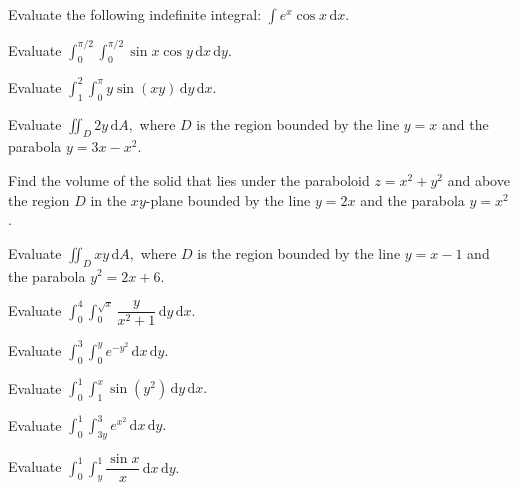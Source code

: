 \documentclass[11pt]{article}
\theoremstyle{break}
\theoremstyle{no_label}
\newcommand{\ddi}{\text{$\,$d}}
\numberwithin{equation}{theorem}
\begin{document}
\begin{example}
    Evaluate the following indefinite integral: $\displaystyle\int e^x\cos x\ddi x.$
\end{example}


\begin{example}
    Evaluate $\displaystyle\int_{0}^{\pi/2}\int_{0}^{\pi/2}\sin x\cos y\ddi x\ddi y.$
\end{example}


\begin{example}
    Evaluate $\displaystyle\int_{1}^{2}\int_{0}^{\pi}y\sin(xy)\ddi y\ddi x.$
\end{example}


\begin{example}
    Evaluate $\displaystyle\iint_D 2y \ddi A,$ where $D$ is the region bounded by the line $y=x$ and the parabola $y=3x-x^2$.
\end{example}


\begin{example}
    Find the volume of the solid that lies under the paraboloid $z=x^2+y^2$ and above the region $D$ in the $xy$-plane bounded by the line $y=2x$ and the parabola $y=x^2$.
\end{example}


\begin{example}
    Evaluate $\displaystyle\iint_D xy\ddi A,$ where $D$ is the region bounded by the line $y=x-1$ and the parabola $y^2=2x+6$.
\end{example}


\begin{example}
    Evaluate $\displaystyle\int_{0}^{4}\int_{0}^{\sqrt{x}}\dfrac{y}{x^2+1}\ddi y\ddi x.$
\end{example}


\begin{example}
    Evaluate $\displaystyle\int_{0}^{3}\int_{0}^{y}e^{-y^2}\ddi x\ddi y.$
\end{example}


\begin{example}
    Evaluate $\displaystyle\int_{0}^{1}\int_{1}^{x}\sin(y^2)\ddi y\ddi x.$
\end{example}


\begin{example}
    Evaluate $\displaystyle\int_{0}^{1}\int_{3y}^{3}e^{x^2}\ddi x\ddi y.$
\end{example}


\begin{example}
    Evaluate $\displaystyle\int_{0}^{1}\int_{y}^{1}\dfrac{\sin x}{x}\ddi x\ddi y.$
\end{example}
\end{document}
